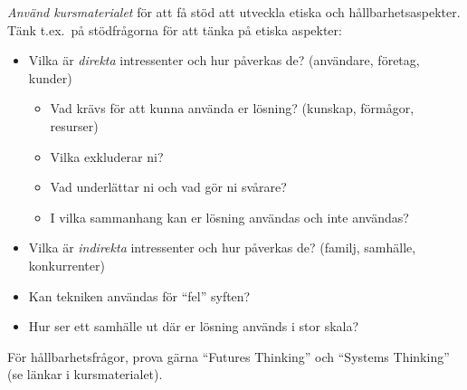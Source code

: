 \emph{Använd kursmaterialet} för att få stöd att utveckla etiska och hållbarhetsaspekter.
Tänk t.ex.~på stödfrågorna för att tänka på etiska aspekter:
\begin{itemize}
\item Vilka är \emph{direkta} intressenter och hur påverkas de? (användare, företag, kunder)
\begin{itemize}
\item  Vad krävs för att kunna använda er lösning? (kunskap, förmågor, resurser)
\item  Vilka exkluderar ni?
\item  Vad underlättar ni och vad gör ni svårare?
\item  I vilka sammanhang kan er lösning användas och inte användas?
\end{itemize}
\item  Vilka är \emph{indirekta} intressenter och hur påverkas de? (familj, samhälle, konkurrenter)
\item  Kan tekniken användas för ``fel'' syften?
\item  Hur ser ett samhälle ut där er lösning används i stor skala?
\end{itemize}

För hållbarhetsfrågor, prova gärna ``Futures Thinking'' och ``Systems Thinking'' (se länkar i kursmaterialet).
